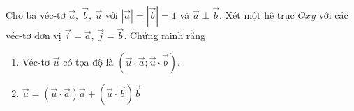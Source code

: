 \begin{bt}%
	Cho ba véc-tơ $\overrightarrow{a},~\overrightarrow{b},~\overrightarrow{u}$ với $\left|\overrightarrow{a}\right|=\left|\overrightarrow{b}\right|=1$ và $\overrightarrow{a}\perp \overrightarrow{b}$. Xét một hệ trục $Oxy$ với các véc-tơ đơn vị $\overrightarrow{i}=\overrightarrow{a}$, $\overrightarrow{j}=\overrightarrow{b}$. Chứng minh rằng

		\begin{enumerate}
			\item Véc-tơ $\overrightarrow{u}$ có tọa độ là $\left(\overrightarrow{u}\cdot \overrightarrow{a};\overrightarrow{u}\cdot \overrightarrow{b}\right)$.
			\item $\overrightarrow{u}=\left(\overrightarrow{u}\cdot \overrightarrow{a}\right)\overrightarrow{a}+\left(\overrightarrow{u}\cdot \overrightarrow{b}\right)\overrightarrow{b}$
			
		\end{enumerate}

	\loigiai{\immini{
		
}}
\end{bt}
